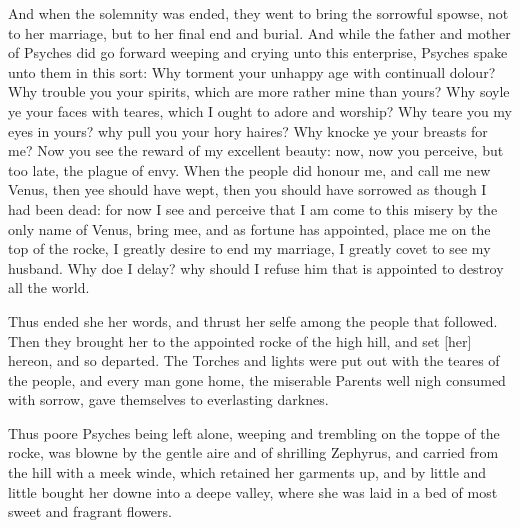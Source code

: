 And when the solemnity was ended, they went to bring the sorrowful spowse, not
to her marriage, but to her final end and burial. And while the father and
mother of Psyches did go forward weeping and crying unto this enterprise,
Psyches spake unto them in this sort: Why torment your unhappy age with
continuall dolour? Why trouble you your spirits, which are more rather mine
than yours? Why soyle ye your faces with teares, which I ought to adore and
worship? Why teare you my eyes in yours? why pull you your hory haires? Why
knocke ye your breasts for me? Now you see the reward of my excellent beauty:
now, now you perceive, but too late, the plague of envy. When the people did
honour me, and call me new Venus, then yee should have wept, then you should
have sorrowed as though I had been dead: for now I see and perceive that I am
come to this misery by the only name of Venus, bring mee, and as fortune has
appointed, place me on the top of the rocke, I greatly desire to end my
marriage, I greatly covet to see my husband. Why doe I delay? why should I
refuse him that is appointed to destroy all the world.

Thus ended she her words, and thrust her selfe among the people that followed.
Then they brought her to the appointed rocke of the high hill, and set [her]
hereon, and so departed. The Torches and lights were put out with the teares of
the people, and every man gone home, the miserable Parents well nigh consumed
with sorrow, gave themselves to everlasting darknes.

Thus poore Psyches being left alone, weeping and trembling on the toppe of the
rocke, was blowne by the gentle aire and of shrilling Zephyrus, and carried
from the hill with a meek winde, which retained her garments up, and by little
and little bought her downe into a deepe valley, where she was laid in a bed of
most sweet and fragrant flowers.

